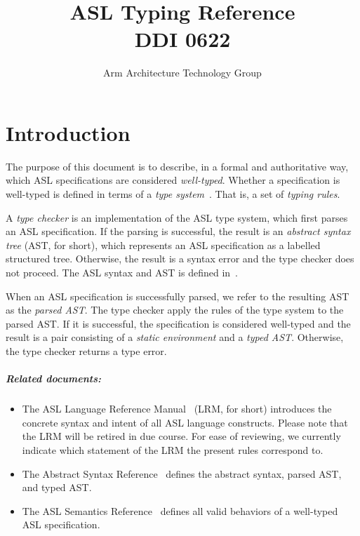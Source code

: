 \documentclass{book}
\author{Arm Architecture Technology Group}
\title{ASL Typing Reference \\
       DDI 0622}
\begin{document}
\maketitle

\tableofcontents{}





\chapter{Introduction}

The purpose of this document is to describe, in a formal and authoritative way,
which ASL specifications are considered \emph{well-typed}.
Whether a specification is well-typed is defined in terms of a \emph{type system}~\cite{TypeSystemsLucaCardelli}.
That is, a set of \emph{typing rules}.

A \emph{type checker} is an implementation of the ASL type system, which first parses an ASL specification.
If the parsing is successful, the result is an \emph{abstract syntax tree} (AST, for short),
which represents an ASL specification as a labelled structured tree. Otherwise, the result is a syntax error
and the type checker does not proceed.
%
The ASL syntax and AST is defined in~\cite{ASLAbstractSyntaxReference}.

When an ASL specification is successfully parsed, we refer to the resulting AST as the \emph{parsed AST}.
The type checker apply the rules of the type system to the parsed AST. If it is successful, the specification
is considered well-typed and the result is a pair consisting of
a \emph{static environment} and a \emph{typed AST}. Otherwise, the type checker returns a type error.

\paragraph{Related documents:}
\begin{itemize}
  \item The ASL Language Reference Manual~\cite{LRM} (LRM, for short) introduces the concrete syntax and intent
  of all ASL language constructs.
  Please note that the LRM will be retired in due course. For ease of reviewing, we currently indicate which statement
  of the LRM the present rules correspond to.
  \item The Abstract Syntax Reference~\cite{ASLAbstractSyntaxReference} defines the abstract syntax, parsed AST, and typed AST.
  \item The ASL Semantics Reference~\cite{ASLSemanticsReference} defines all valid behaviors of a well-typed ASL specification.
\end{itemize}
\end{document}
